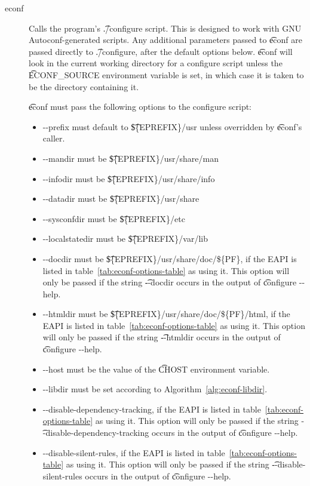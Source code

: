 \begin{description}
\item[econf] Calls the program's \t{./configure} script. This is designed to work with GNU
    Autoconf-generated scripts. Any additional parameters passed to \t{econf} are passed directly
    to \t{./configure}, after the default options below. \t{econf} will look in the current working
    directory for a configure script unless the \t{ECONF_SOURCE} environment variable is set,
    in which case it is taken to be the directory containing it.

     \t{econf} must pass the following options to the configure script:
    \begin{itemize}
    \item -{}-prefix must default to \t{\$\{EPREFIX\}/usr} unless overridden by \t{econf}'s caller.
    \item -{}-mandir must be \t{\$\{EPREFIX\}/usr/share/man}
    \item -{}-infodir must be \t{\$\{EPREFIX\}/usr/share/info}
    \item -{}-datadir must be \t{\$\{EPREFIX\}/usr/share}
    \item -{}-sysconfdir must be \t{\$\{EPREFIX\}/etc}
    \item -{}-localstatedir must be \t{\$\{EPREFIX\}/var/lib}
    \item -{}-docdir must be \t{\$\{EPREFIX\}/usr/share/doc/\$\{PF\}}, if the EAPI is listed in
        table~\ref{tab:econf-options-table} as using it. This option will only be passed if the
        string \t{-{}-docdir} occurs in the output of \t{configure -{}-help}.
    \item -{}-htmldir must be \t{\$\{EPREFIX\}/usr/share/doc/\$\{PF\}/html}, if the EAPI is listed
        in table~\ref{tab:econf-options-table} as using it. This option will only be passed if the
        string \t{-{}-htmldir} occurs in the output of \t{configure -{}-help}.
    \item -{}-host must be the value of the \t{CHOST} environment variable.
    \item -{}-libdir must be set according to Algorithm~\ref{alg:econf-libdir}.
    \item -{}-disable-dependency-tracking, if the EAPI is listed in
        table~\ref{tab:econf-options-table} as using it. This option will only be passed if the
        string \t{-{}-disable-dependency-tracking} occurs in the output of \t{configure -{}-help}.
    \item -{}-disable-silent-rules, if the EAPI is listed in table~\ref{tab:econf-options-table} as
        using it. This option will only be passed if the string \t{-{}-disable-silent-rules} occurs
        in the output of \t{configure -{}-help}.
    \end{itemize}


\end{description}
